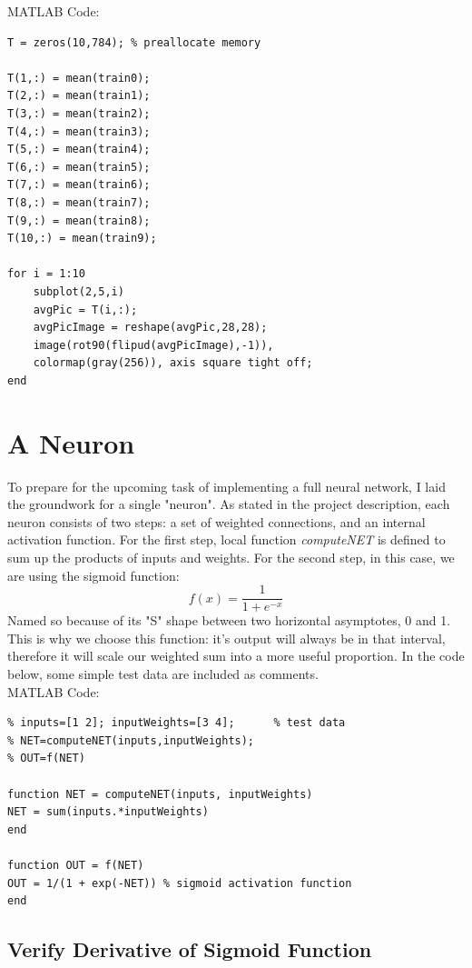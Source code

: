 \documentclass[letterpaper,11pt]{article}
\begin{document}
\vspace{5mm}
MATLAB Code:

\begin{verbatim}
T = zeros(10,784); % preallocate memory

T(1,:) = mean(train0);
T(2,:) = mean(train1);
T(3,:) = mean(train2);
T(4,:) = mean(train3);
T(5,:) = mean(train4);
T(6,:) = mean(train5);
T(7,:) = mean(train6);
T(8,:) = mean(train7);
T(9,:) = mean(train8);
T(10,:) = mean(train9);

for i = 1:10
    subplot(2,5,i)
    avgPic = T(i,:);
    avgPicImage = reshape(avgPic,28,28);
    image(rot90(flipud(avgPicImage),-1)),
    colormap(gray(256)), axis square tight off;
end
\end{verbatim}



\section{A Neuron}



To prepare for the upcoming task of implementing a full neural network, I laid the groundwork for a single "neuron". As stated in the project description, each neuron consists of two steps: a set of weighted connections, and an internal activation function. For the first step, local function \emph{computeNET} is defined to sum up the products of inputs and weights. For the second step, in this case, we are using the sigmoid function: \[f(x)=\frac{1}{1 + e^{-x}}\]
Named so because of its "S" shape between two horizontal asymptotes, 0 and 1. This is why we choose this function: it's output will always be in that interval, therefore it will scale our weighted sum into a more useful proportion. In the code below, some simple test data are included as comments.\\

\vspace{5mm}
MATLAB Code:

\begin{verbatim}
% inputs=[1 2]; inputWeights=[3 4];      % test data
% NET=computeNET(inputs,inputWeights);
% OUT=f(NET)

function NET = computeNET(inputs, inputWeights)
NET = sum(inputs.*inputWeights)
end

function OUT = f(NET)
OUT = 1/(1 + exp(-NET)) % sigmoid activation function
end
\end{verbatim}


\subsection{Verify Derivative of Sigmoid Function}
\end{document}

